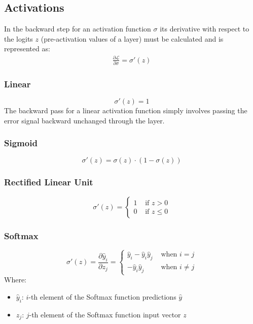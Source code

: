 \documentclass[a4paper]{article}
\newcommand{\haty}{\hat{y}}
\newcommand{\ELL}{\mathcal{L}}
\begin{document}
\subsection*{Activations}
In the backward step for an activation function $\sigma$ its derivative with respect to the logits $z$ (pre-activation values of a layer) must be calculated and is represented as:
\begin{align*}
    \frac{\partial\ELL}{\partial\sigma} = \sigma'(z)
\end{align*}

\subsubsection*{Linear}
\begin{equation*}
    \sigma'(z) = 1
\end{equation*}
The backward pass for a linear activation function simply involves passing the error signal backward unchanged through the layer.

\subsubsection*{Sigmoid}
\begin{equation*}
    \sigma'(z) = \sigma(z) \cdot (1-\sigma(z))
\end{equation*}

\subsubsection*{Rectified Linear Unit}
\begin{equation*}
    \sigma'(z) = \begin{cases}
        1 & \text{ if } z > 0\\
        0 & \text{ if } z \leq 0
    \end{cases}
\end{equation*}

\subsubsection*{Softmax}
\begin{equation*}
    \sigma'(z) = \frac{\partial \haty_i}{\partial z_j} = \begin{cases}
        \haty_i-\haty_i\haty_j & \text{ when } i  =  j \\
               -\haty_i\haty_j & \text{ when } i\neq j
    \end{cases}
\end{equation*}
Where:
\begin{itemize}
    \item $\haty_i$: $i$-th element of the Softmax function predictions $\haty$
    \item $z_j$: $j$-th element of the Softmax function input vector $z$
\end{itemize}
\end{document}

